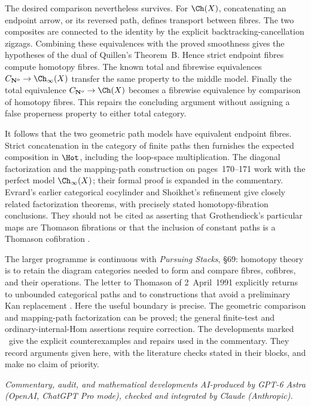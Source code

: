 The desired comparison nevertheless survives.  For $\Ch(X)$, concatenating an
endpoint arrow, or its reversed path, defines transport between fibres.
The two composites are connected to the identity by the explicit
backtracking-cancellation zigzags.  Combining these equivalences with the
proved smoothness gives the hypotheses of the dual of Quillen's Theorem~B.
Hence strict endpoint fibres compute homotopy fibres.  The known total and
fibrewise equivalences
$C_{\mathbf N^o}\to\Ch_\infty(X)$ transfer the same property to the middle
model.  Finally the total equivalence
$C_{\mathbf N^o}\to\Ch(X)$ becomes a fibrewise equivalence by comparison of
homotopy fibres.  This repairs the concluding argument without assigning a
false properness property to either total category.

It follows that the two geometric path models have equivalent endpoint
fibres.  Strict concatenation in the category of finite paths then furnishes
the expected composition in $\Hot$, including the loop-space multiplication.
The diagonal factorization and the mapping-path construction on pages~170--171
work with the perfect model $\Ch_\infty(X)$; their formal proof is expanded in
the commentary.  Evrard's earlier categorical cocylinder and Shoikhet's
refinement give closely related factorization theorems, with precisely stated
homotopy-fibration conclusions.  They should not be cited as asserting that
Grothendieck's particular maps are Thomason fibrations or that the inclusion
of constant paths is a Thomason cofibration \citep{Evrard1975,Shoikhet2016}.

The larger programme is continuous with \emph{Pursuing Stacks}, \S69: homotopy
theory is to retain the diagram categories needed to form and compare fibres,
cofibres, and their operations.  The letter to Thomason of 2~April~1991
explicitly returns to unbounded categorical paths and to constructions that
avoid a preliminary Kan replacement
\citep{Grothendieck1983,Grothendieck1991Letter}.  Here the useful boundary is
precise.  The geometric comparison and mapping-path factorization can be
proved; the general finite-test and ordinary-internal-Hom assertions require
correction.  The developments marked \ours\ give the explicit counterexamples
and repairs used in the commentary.  They record arguments given here,
with the literature checks stated in their blocks, and make no claim of
priority.

\medskip\noindent\textit{Commentary, audit, and mathematical developments
AI-produced by GPT-6 Astra (OpenAI, ChatGPT Pro mode), checked and integrated
by Claude (Anthropic).}

\endgroup

